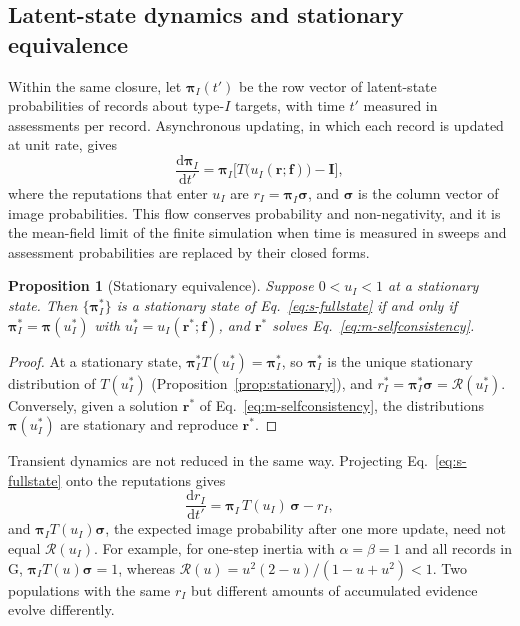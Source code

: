 \documentclass[10pt]{wlscirep}
\newcommand{\Rmap}{\mathscr{R}}            %
\newcommand{\dd}{\mathrm{d}}
\theoremstyle{plain}
\newtheorem{proposition}[lemma]{Proposition}
\theoremstyle{remark}
\begin{document}
\subsection{Latent-state dynamics and stationary equivalence}

Within the same closure, let $\bm\pi_I(t')$ be the row vector of latent-state probabilities of records about type-$I$ targets, with time $t'$ measured in assessments per record. Asynchronous updating, in which each record is updated at unit rate, gives
\begin{equation}
\frac{\dd\bm\pi_I}{\dd t'}=\bm\pi_I\bigl[T\bigl(u_I(\bm r;\bm f)\bigr)-\mathbf I\bigr],
\label{eq:s-fullstate}
\end{equation}
where the reputations that enter $u_I$ are $r_I=\bm\pi_I\bm\sigma$, and $\bm\sigma$ is the column vector of image probabilities. This flow conserves probability and non-negativity, and it is the mean-field limit of the finite simulation when time is measured in sweeps and assessment probabilities are replaced by their closed forms.

\begin{proposition}[Stationary equivalence]\label{prop:equivalence}
Suppose $0<u_I<1$ at a stationary state. Then $\{\bm\pi^*_I\}$ is a stationary state of Eq.~\eqref{eq:s-fullstate} if and only if $\bm\pi^*_I=\bm\pi(u^*_I)$ with $u^*_I=u_I(\bm r^*;\bm f)$, and $\bm r^*$ solves Eq.~\eqref{eq:m-selfconsistency}.
\end{proposition}
\begin{proof}
At a stationary state, $\bm\pi^*_IT(u^*_I)=\bm\pi^*_I$, so $\bm\pi^*_I$ is the unique stationary distribution of $T(u^*_I)$ (Proposition~\ref{prop:stationary}), and $r^*_I=\bm\pi^*_I\bm\sigma=\Rmap(u^*_I)$. Conversely, given a solution $\bm r^*$ of Eq.~\eqref{eq:m-selfconsistency}, the distributions $\bm\pi(u^*_I)$ are stationary and reproduce $\bm r^*$.
\end{proof}

Transient dynamics are not reduced in the same way. Projecting Eq.~\eqref{eq:s-fullstate} onto the reputations gives
\begin{equation}
\frac{\dd r_I}{\dd t'}=\bm\pi_I\,T(u_I)\,\bm\sigma-r_I,
\label{eq:s-projection}
\end{equation}
and $\bm\pi_IT(u_I)\bm\sigma$, the expected image probability after one more update, need not equal $\Rmap(u_I)$. For example, for one-step inertia with $\alpha=\beta=1$ and all records in G, $\bm\pi_IT(u)\bm\sigma=1$, whereas $\Rmap(u)=u^2(2-u)/(1-u+u^2)<1$. Two populations with the same $r_I$ but different amounts of accumulated evidence evolve differently.
\end{document}
